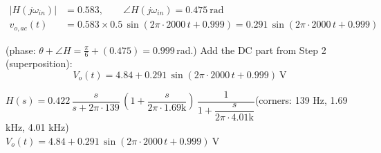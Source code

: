 \documentclass[11pt]{article}
\begin{document}
\begin{align*}
|H(j\omega_{in})| &= 0.583, \qquad \angle H(j\omega_{in}) = 0.475\ \mathrm{rad} \\
v_{o,ac}(t) &= 0.583\times 0.5\,\sin\left(2\pi\cdot 2000\,t + 0.999\right) = 0.291\,\sin\left(2\pi\cdot 2000\,t + 0.999\right)
\end{align*}

(phase: $\theta + \angle H = \frac{\pi}{6} + (0.475) = 0.999$\,rad.)
Add the DC part from Step 2 (superposition):
\[
\boxed{V_o(t) = 4.84 + 0.291\,\sin\left(2\pi\cdot 2000\,t + 0.999\right)\ \mathrm{V}}
\]

\begin{ansbox}
$H(s) = 0.422\,\dfrac{s}{s+2\pi\cdot 139}\,\left(1+\dfrac{s}{2\pi\cdot 1.69\mathrm{k}}\right)\,\dfrac{1}{1+\dfrac{s}{2\pi\cdot 4.01\mathrm{k}}}$\quad (corners: 139 Hz, 1.69 kHz, 4.01 kHz)\\[4pt]
$V_o(t) = 4.84 + 0.291\,\sin\left(2\pi\cdot 2000\,t + 0.999\right)\ \mathrm{V}$
\end{ansbox}
\end{document}

